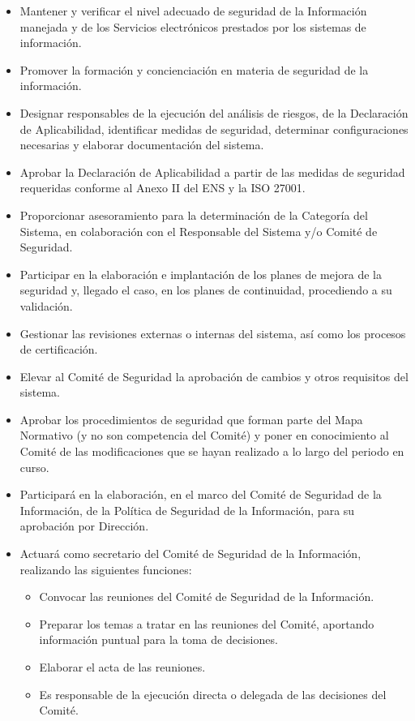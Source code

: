\begin{enumerate}[label=\alph*)]
\begin{itemize}
  \item Mantener y verificar el nivel adecuado de seguridad de la Informaci\'on manejada y de los Servicios electr\'onicos prestados por los sistemas de informaci\'on.
  \item Promover la formaci\'on y concienciaci\'on en materia de seguridad de la informaci\'on.
  \item Designar responsables de la ejecuci\'on del an\'alisis de riesgos, de la Declaraci\'on de Aplicabilidad, identificar medidas de seguridad, determinar configuraciones necesarias y elaborar documentaci\'on del sistema.
  \item Aprobar la Declaraci\'on de Aplicabilidad a partir de las medidas de seguridad requeridas conforme al Anexo II del ENS y la ISO 27001.
  \item Proporcionar asesoramiento para la determinaci\'on de la Categor\'ia del Sistema, en colaboraci\'on con el Responsable del Sistema y/o Comit\'e de Seguridad.
  \item Participar en la elaboraci\'on e implantaci\'on de los planes de mejora de la seguridad y, llegado el caso, en los planes de continuidad, procediendo a su validaci\'on.
  \item Gestionar las revisiones externas o internas del sistema, as\'i como los procesos de certificaci\'on.
  \item Elevar al Comit\'e de Seguridad la aprobaci\'on de cambios y otros requisitos del sistema.
  \item Aprobar los procedimientos de seguridad que forman parte del Mapa Normativo (y no son competencia del Comit\'e) y poner en conocimiento al Comit\'e de las modificaciones que se hayan realizado a lo largo del periodo en curso.
  \item Participar\'a en la elaboraci\'on, en el marco del Comit\'e de Seguridad de la Informaci\'on, de la Pol\'itica de Seguridad de la Informaci\'on, para su aprobaci\'on por Direcci\'on.
  \item Actuar\'a como secretario del Comit\'e de Seguridad de la Informaci\'on, realizando las siguientes funciones:
  \begin{itemize}
    \item Convocar las reuniones del Comit\'e de Seguridad de la Informaci\'on.
    \item Preparar los temas a tratar en las reuniones del Comit\'e, aportando informaci\'on puntual para la toma de decisiones.
    \item Elaborar el acta de las reuniones.
    \item Es responsable de la ejecuci\'on directa o delegada de las decisiones del Comit\'e.
  \end{itemize}
\end{itemize}


\end{enumerate}
